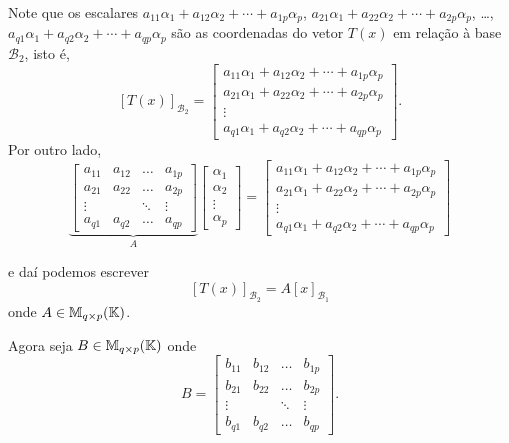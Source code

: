 Note que os escalares $a_{11}\alpha_1 + a_{12}\alpha_2 + \cdots + a_{1p}\alpha_p$, $a_{21}\alpha_1 + a_{22}\alpha_2 + \cdots + a_{2p}\alpha_p$, \dots, $a_{q1}\alpha_1 + a_{q2}\alpha_2 + \cdots + a_{qp}\alpha_p$ são as coordenadas do vetor $T(x)$ em relação à base $\mathcal{B}_2$, isto é,
\[
    [T(x)]_{\mathcal{B}_2} = \begin{bmatrix}
    a_{11}\alpha_1 + a_{12}\alpha_2 + \cdots + a_{1p}\alpha_p\\
    a_{21}\alpha_1 + a_{22}\alpha_2 + \cdots + a_{2p}\alpha_p\\
    \vdots\\
    a_{q1}\alpha_1 + a_{q2}\alpha_2 + \cdots + a_{qp}\alpha_p
    \end{bmatrix}.
\]
Por outro lado,
\[
    \underbrace{\begin{bmatrix}
    a_{11} & a_{12} & \dots & a_{1p}\\
    a_{21} & a_{22} & \dots & a_{2p}\\
    \vdots & & \ddots & \vdots\\
    a_{q1} & a_{q2} & \dots & a_{qp}
    \end{bmatrix}}_{A}\begin{bmatrix}
    \alpha_1\\
    \alpha_2\\
    \vdots\\
    \alpha_p
    \end{bmatrix} = \begin{bmatrix}
    a_{11}\alpha_1 + a_{12}\alpha_2 + \cdots + a_{1p}\alpha_p\\
    a_{21}\alpha_1 + a_{22}\alpha_2 + \cdots + a_{2p}\alpha_p\\
    \vdots \\
    a_{q1}\alpha_1 + a_{q2}\alpha_2 + \cdots + a_{qp}\alpha_p
    \end{bmatrix}
\]

e daí podemos escrever
\[
    [T(x)]_{\mathcal{B}_2} = A[x]_{\mathcal{B}_1}
\]
onde $A \in \mathbb{M}_{q\times p}(\mathbb{K})$.

Agora seja $B \in \mathbb{M}_{q\times p}(\mathbb{K})$ onde
\[
    B = \begin{bmatrix}
    b_{11} & b_{12} & \dots & b_{1p}\\
    b_{21} & b_{22} & \dots & b_{2p}\\
    \vdots & & \ddots & \vdots\\
    b_{q1} & b_{q2} & \dots & b_{qp}
    \end{bmatrix}.
\]

